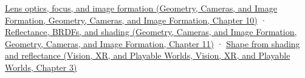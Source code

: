 \href{../03-Geometry-Cameras-and-Image-Formation/main.pdf\#nameddest=03-visual-computing-i-ch003-lens-optics-focus-and-image-formation}{Lens optics, focus, and image formation (Geometry, Cameras, and Image Formation, Geometry, Cameras, and Image Formation, Chapter 10)} · \href{../03-Geometry-Cameras-and-Image-Formation/main.pdf\#nameddest=03-visual-computing-i-ch004-reflectance-brdfs-and-shading}{Reflectance, BRDFs, and shading (Geometry, Cameras, and Image Formation, Geometry, Cameras, and Image Formation, Chapter 11)} · \href{../07-Vision-XR-and-Playable-Worlds/main.pdf\#nameddest=04-visual-computing-ii-ch032-shape-from-shading-and-reflectance}{Shape from shading and reflectance (Vision, XR, and Playable Worlds, Vision, XR, and Playable Worlds, Chapter 3)}
